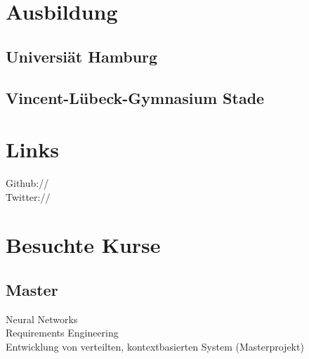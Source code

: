 \documentclass[]{deedy-resume-openfont}
\begin{document}


%
%

\begin{minipage}[t]{0.33\textwidth}


\section{Ausbildung}

\subsection{Universiät Hamburg}
\sectionsep

\sectionsep

\subsection{Vincent-Lübeck-Gymnasium Stade}
\sectionsep


\section{Links}
Github:// \href{https://github.com/teekaay}
{} \\
Twitter://  \href{https://twitter.com/tee_okay}{} \\
\sectionsep


\section{Besuchte Kurse}
\subsection{Master}
Neural Networks \\
Requirements Engineering \\
Entwicklung von verteilten, kontextbasierten System (Masterprojekt)
\sectionsep


\end{minipage}
\end{document}
